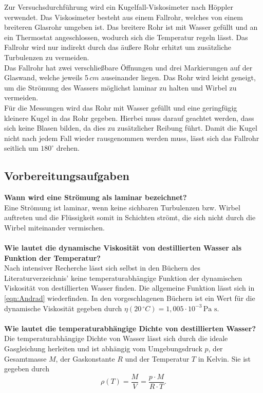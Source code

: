 Zur Versuchsdurchführung wird ein Kugelfall-Viskosimeter nach Höppler verwendet. Das Viskosimeter besteht aus einem Fallrohr, welches von
einem breiteren Glasrohr umgeben ist. Das breitere Rohr ist mit Wasser gefüllt und an ein Thermostat angeschlossen, wodurch sich die Temperatur regeln
lässt. Das Fallrohr wird nur indirekt durch das äußere Rohr erhitzt um zusätzliche Turbulenzen zu vermeiden.\\
Das Fallrohr hat zwei verschließbare Öffnungen und drei Markierungen auf der Glaswand, welche jeweils 5\,$\unit{cm}$ auseinander liegen. Das Rohr wird
leicht geneigt, um die Strömung des Wassers möglichst laminar zu halten und Wirbel zu vermeiden.\\
Für die Messungen wird das Rohr mit Wasser gefüllt und eine geringfügig kleinere Kugel in das Rohr gegeben. Hierbei muss darauf geachtet werden, dass sich keine 
Blasen bilden, da dies zu zusätzlicher Reibung führt. Damit die Kugel nicht nach jedem Fall wieder rausgenommen werden muss, lässt sich das Fallrohr seitlich um 
$\mathrm{180^{\circ}}$ drehen.\\

\subsection{Vorbereitungsaufgaben}

\textbf{Wann wird eine Strömung als laminar bezeichnet?} \\
Eine Strömung ist laminar, wenn keine sichbaren Turbulenzen bzw. Wirbel auftreten und die Flüssigkeit somit in Schichten strömt, die sich nicht durch die Wirbel
miteinander vermischen.\\ \\
\textbf{Wie lautet die dynamische Viskosität von destillierten Wasser als Funktion der Temperatur?}\\
Nach intensiver Recherche lässt sich selbst in den Büchern des Literaturverzeichnis' keine temperaturabhängige Funktion der dynamischen Viskosität von destillierten Wasser 
finden. Die allgemeine Funktion lässt sich in \autoref{eqn:Andrad} wiederfinden. In den vorgeschlagenen Büchern ist ein Wert für die dynamische Viskosität gegeben
durch $\eta(20 \, ^{\circ}\unit{C}) = 1,005 \cdot \mathrm{10^{-3} \, Pa \, \, s}$.\\ \\
\textbf{Wie lautet die temperaturabhängige Dichte von destillierten Wasser?}\\
Die temperaturabhängige Dichte von Wasser lässt sich durch die ideale Gasgleichung herleiten und ist abhängig vom Umgebungsdruck $p$, der Gesamtmasse $M$, der Gaskonstante
$R$ und der Temperatur $T$ in Kelvin. Sie ist gegeben durch
\begin{equation}
    \label{eqn:tempDichte}
    \rho(T) = \frac{M}{V} = \frac{p \cdot M}{R \cdot T}.
\end{equation}